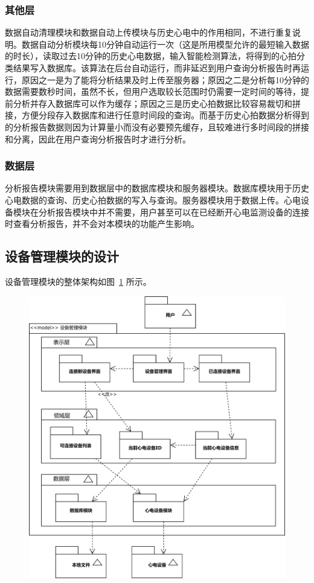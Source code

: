 \subsubsection{其他层}

数据自动清理模块和数据自动上传模块与历史心电中的作用相同，不进行重复说明。数据自动分析模块每10分钟自动运行一次（这是所用模型允许的最短输入数据的时长），读取过去10分钟的历史心电数据，输入智能检测算法，将得到的心拍分类结果写入数据库。该算法在后台自动运行，而非延迟到用户查询分析报告时再运行，原因之一是为了能将分析结果及时上传至服务器；原因之二是分析每10分钟的数据需要数秒时间，虽然不长，但用户选取较长范围时仍需要一定时间的等待，提前分析并存入数据库可以作为缓存；原因之三是历史心拍数据比较容易裁切和拼接，方便分段存入数据库和进行任意时间段的查询。而基于历史心拍数据分析得到的分析报告数据则因为计算量小而没有必要预先缓存，且较难进行多时间段的拼接和分离，因此在用户查询分析报告时才进行分析。

\subsubsection{数据层}

分析报告模块需要用到数据层中的数据库模块和服务器模块。数据库模块用于历史心电数据的查询、历史心拍数据的写入与查询。服务器模块用于数据上传。心电设备模块在分析报告模块中并不需要，用户甚至可以在已经断开心电监测设备的连接时查看分析报告，并不会对本模块的功能产生影响。

\subsection{设备管理模块的设计}\label{subsec:device-design}

设备管理模块的整体架构如图~\ref{fig:model-device} 所示。

\begin{figure}[!ht]
    \centering
    \includegraphics[width=.9\textwidth]{../assets/model-device.drawio}
    \label{fig:model-device}
\end{figure}

